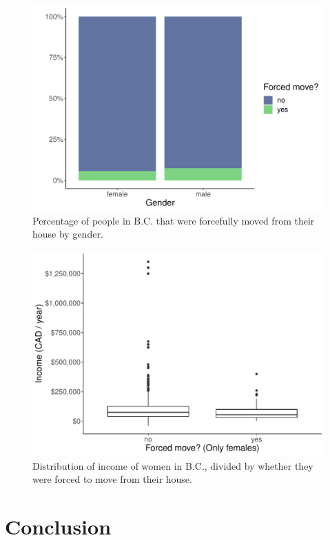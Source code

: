 \documentclass[11pt]{article}
\begin{document}
\begin{figure}
  \centering
  \includegraphics[scale=0.5]{fig/fm_gender.pdf}
  \caption{Percentage of people in B.C. that were forcefully moved
  from their house by gender.}
  \label{fig:fm_gender}
\end{figure}



\begin{figure}
  \centering
  \includegraphics[scale=0.5]{fig/income_gender.pdf}
  \caption{Distribution of income of women in B.C., divided by
  whether they were forced to move from their house.}
  \label{fig:income_gender}
\end{figure}





\section{Conclusion} \label{sec:conclusion}





\clearpage


\end{document}
